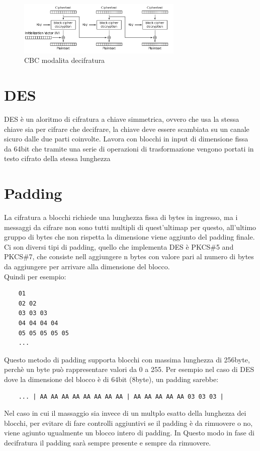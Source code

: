 \begin{figure}[h!]
    \includegraphics[width=0.7\textwidth]{img/CBC_decr.png}
    \centering
    \caption{CBC modalita decifratura}
    \label{fig:cbc_decr}
\end{figure}

\section{DES}
DES è un aloritmo di cifratura a chiave simmetrica, ovvero che usa la stessa chiave sia per cifrare che decifrare, 
la chiave deve essere scambiata su un canale sicuro dalle due parti coinvolte.
Lavora con blocchi in input di dimensione fissa da 64bit che tramite una serie di operazioni di trasformazione vengono 
portati in testo cifrato della stessa lunghezza
\section{Padding}
La cifratura a blocchi richiede una lunghezza fissa di bytes in ingresso, ma i messaggi da cifrare 
 non sono tutti multipli di quest'ultimap per questo, all'ultimo gruppo di bytes che non rispetta la dimensione viene aggiunto del padding finale.
Ci son diversi tipi di padding, quello che implementa DES è PKCS\#5 and PKCS\#7, che consiste nell aggiungere n bytes con valore pari al numero di bytes da
 aggiungere per arrivare alla dimensione del blocco. 
\\Quindi per esempio:

\begin{verbatim}
    01
    02 02
    03 03 03
    04 04 04 04
    05 05 05 05 05
    ...
\end{verbatim}
Questo metodo di padding supporta blocchi con massima lunghezza di 256byte, perchè un byte può rappresentare valori da 0 a 255.
Per esempio nel caso di DES dove la dimensione del blocco è di 64bit (8byte), un padding sarebbe:

\begin{verbatim}
    ... | AA AA AA AA AA AA AA AA | AA AA AA AA AA 03 03 03 |
\end{verbatim}
Nel caso in cui il massaggio sia invece di un multplo esatto della lunghezza dei blocchi, per evitare di fare controlli aggiuntivi se il padding è da rimuovere o no, viene agiunto ugualmente un blocco intero di padding. In Questo modo in fase di decifratura il padding sarà sempre presente e sempre da rimuovere.
